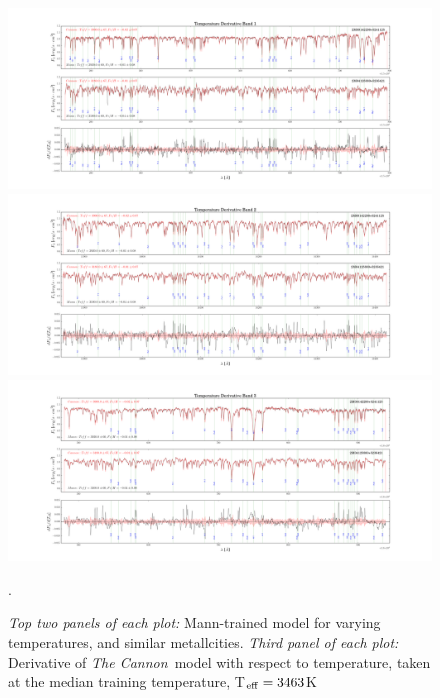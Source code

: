 \documentclass[modern]{aastex62}
\newcommand{\thecannon}{\textsl{The Cannon}}
\begin{document}
\begin{figure}[ht]
\begin{center}
\includegraphics[width=16cm]{figures/demo_derivatives_teff1.png}
\includegraphics[width=16cm]{figures/demo_derivatives_teff2.png}
\includegraphics[width=16cm]{figures/demo_derivatives_teff3.png}
\end{center}
\caption{\textit{Top two panels of each plot:} Mann-trained model for varying temperatures, and similar metallcities. \textit{Third panel of each plot:} Derivative of \thecannon\ model with respect to temperature, taken at the median training temperature, T$_{\rm eff}=3463$K}. \label{fig:demo_teff}
\end{figure}
\end{document}
